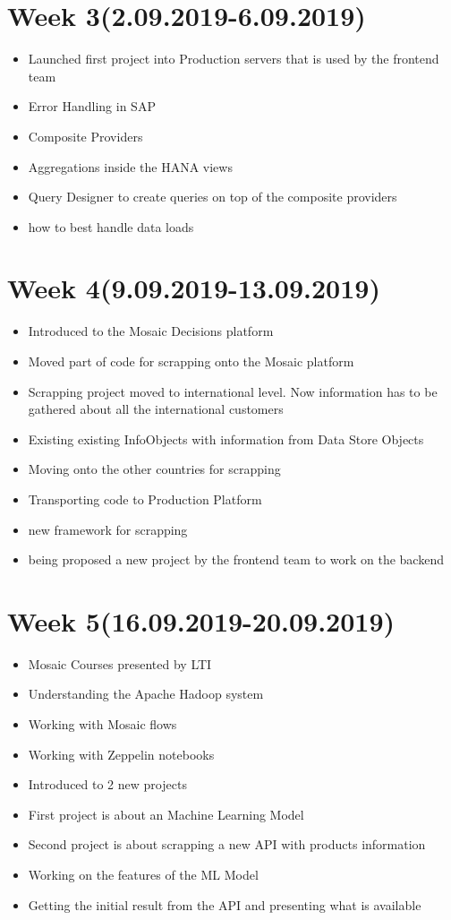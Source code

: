 \documentclass{article}
\begin{document}
	\section{Week 3(2.09.2019-6.09.2019)}
	\begin{itemize}
		\item Launched first project into Production servers that is used by the frontend team
		\item Error Handling in SAP
		\item Composite Providers
		\item Aggregations inside the HANA views
		\item Query Designer to create queries on top of the composite providers
		\item how to best handle data loads
	\end{itemize}

	\section{Week 4(9.09.2019-13.09.2019)}
	\begin{itemize}
		\item Introduced to the Mosaic Decisions platform
		\item Moved part of code for scrapping onto the Mosaic platform
		\item Scrapping project moved to international level. Now information has to be gathered about all the international customers
		\item Existing existing InfoObjects with information from Data Store Objects
		\item Moving onto the other countries for scrapping
		\item Transporting code to Production Platform
		\item new framework for scrapping
		\item being proposed a new project by the frontend team to work on the backend
	\end{itemize}

	\section{Week 5(16.09.2019-20.09.2019)}
	\begin{itemize}
		\item Mosaic Courses presented by LTI
		\item Understanding the Apache Hadoop system
		\item Working with Mosaic flows
		\item Working with Zeppelin notebooks
		\item Introduced to 2 new projects
		\item First project is about an Machine Learning Model
		\item Second project is about scrapping a new API with products information
		\item Working on the features of the ML Model
		\item Getting the initial result from the API and presenting what is available
	\end{itemize}
\end{document}
